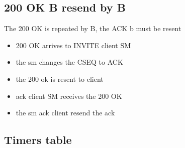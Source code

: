 \documentclass[a4paper]{report}
\begin{document}
\subsection{200 OK B resend by B}
The 200 OK is repeated by B, the ACK b must be resent
\begin{itemize}
\item 200 OK arrives to INVITE client SM
\item the sm changes the CSEQ to ACK
\item the 200 ok is resent to client
\item ack client SM receives the 200 OK
\item the sm ack client resend the ack
\end{itemize}

\subsection{Timers table}
\end{document}
